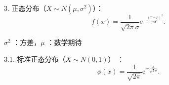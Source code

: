 3. 正态分布（$X\sim N\left( \mu,\sigma^{2} \right) $）：\[
    f\left( x \right) =\frac{1}{\sqrt{2\pi} \sigma}\text{e}^{-\frac{\left( x-\mu \right) ^{2}}{2\sigma^{2}}}
.\] 

\begin{notation}
    $\sigma^{2}$ ：方差，$\mu$ ：数学期待
\end{notation}

3.1. 标准正态分布（$X\sim N\left( 0,1 \right) $） ：\[
\phi\left( x \right) =\frac{1}{\sqrt{2\pi}} \text{e}^{-\frac{x}{\sqrt{2} \sigma}}
.\] 
